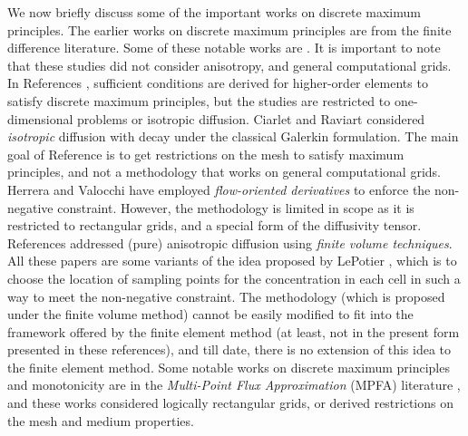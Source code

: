 \documentclass[11pt]{amsart}
\begin{document}
We now briefly discuss some of the important works on discrete maximum principles. The earlier 
works on discrete maximum principles are from the finite difference literature. Some of these 
notable works are \cite{Varga_SIAMJNA_1966_v3_p355,Ciarlet_AequationesMath_1970_v4_p338}. 
It is important to note that these studies did not consider anisotropy, and general computational grids. 
In References \cite{Hohn_Mittelmann_Computing_1981_v27_p145,Yanik_ComputMathAppl_1987_v14_p459,
Yanik_ComputMathAppl_1989_v17_p1431,Vejchodsky_Solin_MathComput_2007_v76_p1833}, sufficient 
conditions are derived for higher-order elements to satisfy discrete maximum principles, but 
the studies are restricted to one-dimensional problems or isotropic diffusion. 
Ciarlet and Raviart \cite{Ciarlet_Raviart_CMAME_1973_v2_p17} considered \emph{isotropic} 
diffusion with decay under the classical Galerkin formulation. The main goal of Reference 
\cite{Ciarlet_Raviart_CMAME_1973_v2_p17} is to get restrictions on the mesh to satisfy 
maximum principles, and not a methodology that works on general computational grids. 
Herrera and Valocchi \cite{Herrera_Valocchi_GW_2006_v44_p803} have employed \emph{flow-oriented 
  derivatives} to enforce the non-negative constraint. However, the methodology is limited in 
scope as it is restricted to rectangular grids, and a special form of the diffusivity 
tensor.  
References \cite{LePotier_CRM_2005_v341_p787,Lipnikov_Shashkov_Svyatskiy_Vassilevski_JCP_2007_v227_p492,
Yuan_Sheng_JCP_2008_v227_p6288,Lipnikov_Svyatskiy_Vassilevski_JCP_2009_v228_p703} addressed (pure) 
anisotropic diffusion using \emph{finite volume techniques}. All these papers are some variants of 
the idea proposed by LePotier \cite{LePotier_CRM_2005_v341_p787}, which is to choose the location 
of sampling points for the concentration in each cell in such a way to meet the non-negative 
constraint. The methodology (which is proposed under the finite volume method) cannot be easily 
modified to fit into the framework offered by the finite element method (at least, not in the 
present form presented in these references), and till date, there is no extension of this idea 
to the finite element method. Some notable works on discrete maximum principles and monotonicity 
are in the \emph{Multi-Point Flux Approximation} (MPFA) literature 
\cite{Mlacnik_Durlofsky_JCP_2006_v216_p337,Nordbotten_Aavatsmark_Eigestad_NumerMath_2007_v106_p255,
Keilegavlen_Nordbotten_Aavatsmark_AML_2009_v22_p1178}, and these works considered logically 
rectangular grids, or derived restrictions on the mesh and medium properties. 
\end{document}
